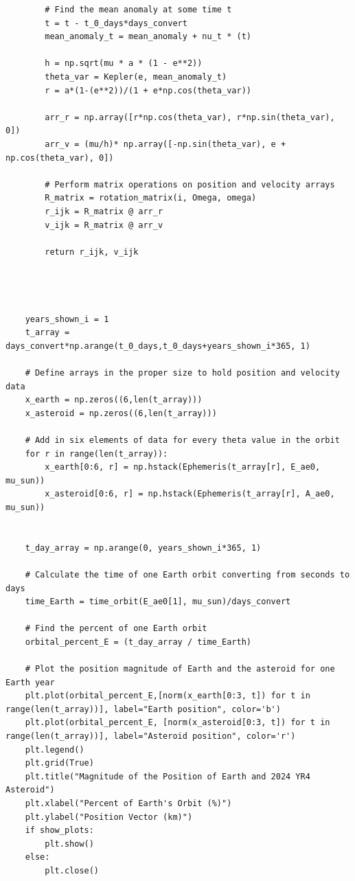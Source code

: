 \documentclass[12pt,twocolumn]{article}  %
\begin{document}
\begin{lstlisting}
        # Find the mean anomaly at some time t 
        t = t - t_0_days*days_convert
        mean_anomaly_t = mean_anomaly + nu_t * (t)
    
        h = np.sqrt(mu * a * (1 - e**2))
        theta_var = Kepler(e, mean_anomaly_t)
        r = a*(1-(e**2))/(1 + e*np.cos(theta_var))
        
        arr_r = np.array([r*np.cos(theta_var), r*np.sin(theta_var), 0])
        arr_v = (mu/h)* np.array([-np.sin(theta_var), e + np.cos(theta_var), 0])
        
        # Perform matrix operations on position and velocity arrays
        R_matrix = rotation_matrix(i, Omega, omega)
        r_ijk = R_matrix @ arr_r
        v_ijk = R_matrix @ arr_v
        
        return r_ijk, v_ijk
    
    
    
    
    years_shown_i = 1
    t_array = days_convert*np.arange(t_0_days,t_0_days+years_shown_i*365, 1) 
    
    # Define arrays in the proper size to hold position and velocity data
    x_earth = np.zeros((6,len(t_array)))
    x_asteroid = np.zeros((6,len(t_array)))
    
    # Add in six elements of data for every theta value in the orbit
    for r in range(len(t_array)):
        x_earth[0:6, r] = np.hstack(Ephemeris(t_array[r], E_ae0, mu_sun))
        x_asteroid[0:6, r] = np.hstack(Ephemeris(t_array[r], A_ae0, mu_sun))
        
    
    t_day_array = np.arange(0, years_shown_i*365, 1)
    
    # Calculate the time of one Earth orbit converting from seconds to days
    time_Earth = time_orbit(E_ae0[1], mu_sun)/days_convert 
    
    # Find the percent of one Earth orbit
    orbital_percent_E = (t_day_array / time_Earth) 
    
    # Plot the position magnitude of Earth and the asteroid for one Earth year
    plt.plot(orbital_percent_E,[norm(x_earth[0:3, t]) for t in range(len(t_array))], label="Earth position", color='b')
    plt.plot(orbital_percent_E, [norm(x_asteroid[0:3, t]) for t in range(len(t_array))], label="Asteroid position", color='r')
    plt.legend()
    plt.grid(True)
    plt.title("Magnitude of the Position of Earth and 2024 YR4 Asteroid")
    plt.xlabel("Percent of Earth's Orbit (%)")
    plt.ylabel("Position Vector (km)")
    if show_plots:
        plt.show()
    else:
        plt.close()
    

\end{lstlisting}
\end{document}
